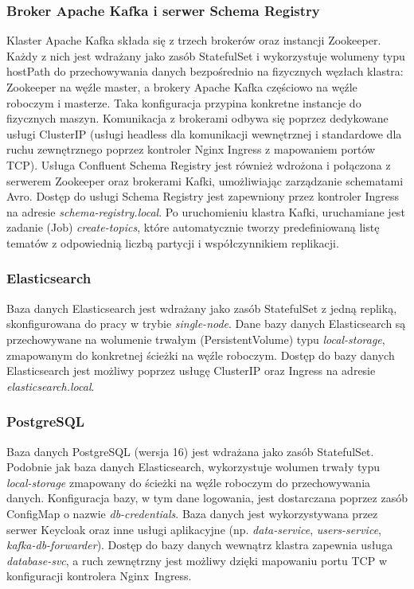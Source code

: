 \subsubsection{Broker Apache Kafka i serwer Schema Registry}
Klaster Apache Kafka składa się z trzech brokerów oraz instancji Zookeeper. Każdy z nich jest wdrażany jako zasób StatefulSet i wykorzystuje wolumeny typu hostPath do przechowywania danych bezpośrednio na fizycznych węzłach klastra: Zookeeper na węźle master, a brokery Apache Kafka częściowo na węźle roboczym i masterze. Taka konfiguracja przypina konkretne instancje do fizycznych maszyn. Komunikacja z brokerami odbywa się poprzez dedykowane usługi \mbox{ClusterIP} (usługi headless dla komunikacji wewnętrznej i standardowe dla ruchu zewnętrznego poprzez kontroler Nginx Ingress z mapowaniem portów TCP).
\newpage
Usługa Confluent Schema Registry jest również wdrożona i połączona z serwerem Zookeeper oraz brokerami Kafki, umożliwiając zarządzanie schematami Avro. Dostęp do usługi Schema Registry jest zapewniony przez kontroler Ingress na adresie \textit{schema-registry.local}. Po uruchomieniu klastra Kafki, uruchamiane jest zadanie (Job) \textit{create-topics}, które automatycznie tworzy predefiniowaną listę tematów z odpowiednią liczbą partycji i współczynnikiem replikacji.

\subsubsection{Elasticsearch}
Baza danych Elasticsearch jest wdrażany jako zasób StatefulSet z jedną repliką, skonfigurowana do pracy w trybie \textit{single-node}. Dane bazy danych Elasticsearch są przechowywane na wolumenie trwałym (PersistentVolume) typu \textit{local-storage}, zmapowanym do konkretnej ścieżki na węźle roboczym. Dostęp do bazy danych Elasticsearch jest możliwy poprzez usługę ClusterIP oraz Ingress na adresie \textit{elasticsearch.local}.

\subsubsection{PostgreSQL}
Baza danych PostgreSQL (wersja 16) jest wdrażana jako zasób StatefulSet. Podobnie jak baza danych Elasticsearch, wykorzystuje wolumen trwały typu \textit{local-storage} zmapowany do ścieżki na węźle roboczym do przechowywania danych. Konfiguracja bazy, w tym dane logowania, jest dostarczana poprzez zasób \mbox{ConfigMap} o nazwie \textit{db-credentials}. Baza danych jest wykorzystywana przez serwer Keycloak oraz inne usługi aplikacyjne (np. \textit{data-service}, \textit{users-service}, \textit{kafka-db-forwarder}). Dostęp do bazy danych wewnątrz klastra zapewnia usługa \textit{database-svc}, a ruch zewnętrzny jest możliwy dzięki mapowaniu portu TCP w konfiguracji kontrolera \mbox{Nginx Ingress}.

